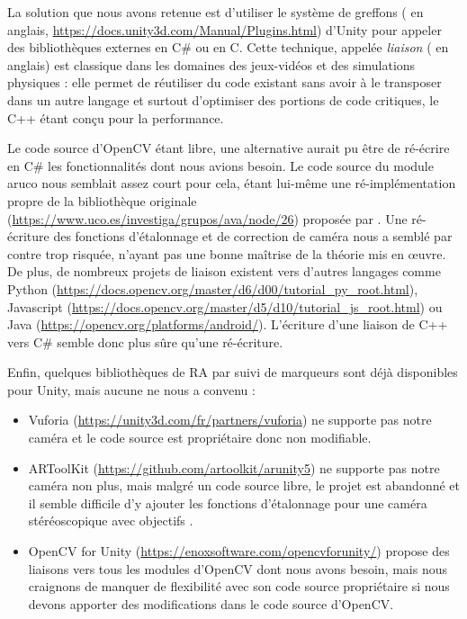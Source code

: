 La solution que nous avons retenue est d'utiliser le système de greffons ( en anglais, \url{https://docs.unity3d.com/Manual/Plugins.html}) d'Unity pour appeler des bibliothèques externes en C\# ou en C. Cette technique, appelée \emph{liaison} ( en anglais) est classique dans les domaines des jeux-vidéos et des simulations physiques : elle permet de réutiliser du code existant sans avoir à le transposer dans un autre langage et surtout d'optimiser des portions de code critiques, le C++ étant conçu pour la performance.

Le code source d'OpenCV étant libre, une alternative aurait pu être de ré-écrire en C\# les fonctionnalités dont nous avions besoin. Le code source du module aruco nous semblait assez court pour cela, étant lui-même une ré-implémentation propre de la bibliothèque originale (\url{https://www.uco.es/investiga/grupos/ava/node/26}) proposée par \cite{Garrido-Jurado2014}. Une ré-écriture des fonctions d'étalonnage et de correction de caméra nous a semblé par contre trop risquée, n'ayant pas une bonne maîtrise de la théorie mis en \oe uvre. De plus, de nombreux projets de liaison existent vers d'autres langages comme Python (\url{https://docs.opencv.org/master/d6/d00/tutorial_py_root.html}), Javascript (\url{https://docs.opencv.org/master/d5/d10/tutorial_js_root.html}) ou Java (\url{https://opencv.org/platforms/android/}). L'écriture d'une liaison de C++ vers C\# semble donc plus sûre qu'une ré-écriture.

Enfin, quelques bibliothèques de RA par suivi de marqueurs sont déjà disponibles pour Unity, mais aucune ne nous a convenu :
\begin{itemize}
  \item Vuforia (\url{https://unity3d.com/fr/partners/vuforia}) ne supporte pas notre caméra et le code source est propriétaire donc non modifiable.
  \item ARToolKit (\url{https://github.com/artoolkit/arunity5}) ne supporte pas notre caméra non plus, mais malgré un code source libre, le projet est abandonné et il semble difficile d'y ajouter les fonctions d'étalonnage pour une caméra stéréoscopique avec objectifs .
  \item OpenCV for Unity (\url{https://enoxsoftware.com/opencvforunity/}) propose des liaisons vers tous les modules d'OpenCV dont nous avons besoin, mais nous craignons de manquer de flexibilité avec son code source propriétaire si nous devons apporter des modifications dans le code source d'OpenCV.
\end{itemize}

